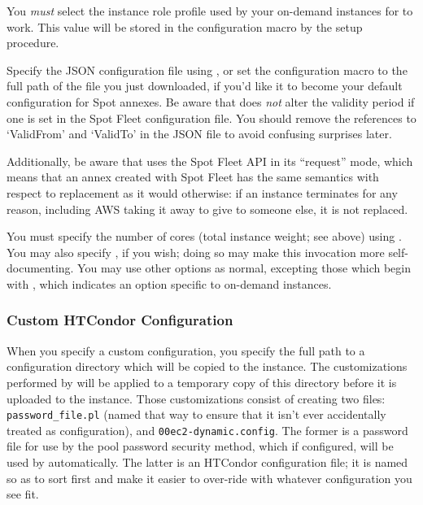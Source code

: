 You \emph{must} select the instance role profile used by your on-demand
instances for  to work.  This value will be stored in the
configuration macro 
by the setup procedure.


Specify the JSON configuration file using ,
or set the configuration macro  to
the full path of the file you just downloaded, if you'd like it to become
your default configuration for Spot annexes.  Be aware that 
does \emph{not} alter the validity period if one is set in the Spot
Fleet configuration file.  You should remove the references to `ValidFrom'
and `ValidTo' in the JSON file to avoid confusing surprises later.

Additionally, be aware that  uses the Spot Fleet API in
its ``request'' mode, which means that an annex created with Spot
Fleet has the same semantics with respect to replacement as it would
otherwise: if an instance terminates for any reason, including AWS
taking it away to give to someone else, it is not replaced.

You must specify the number of cores (total instance weight; see above) using
.  You may also specify , if you wish;
doing so may make this  invocation more self-documenting.
You may use other options as normal, excepting those which begin with
, which indicates an option specific to on-demand
instances.

\subsubsection{Custom HTCondor Configuration}

When you specify a custom configuration, you specify the full path to a
configuration directory which will be copied to the instance.  The customizations
performed by  will be applied to a temporary copy of this
directory before it is uploaded to the instance.  Those customizations
consist of creating two files: {\tt password\_file.pl} (named that way to ensure
that it isn't ever accidentally treated as configuration), and
{\tt 00ec2-dynamic.config}.  The former is a password file for use by the pool
password security method, which if configured, will be used by 
automatically.  The latter is an HTCondor configuration file; it is named
so as to sort first and make it easier to over-ride with whatever configuration
you see fit.

